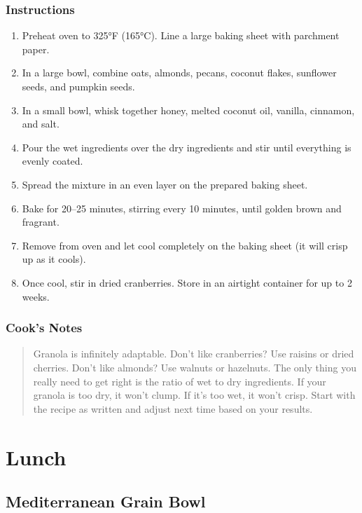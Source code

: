 \documentclass[
    language=english,
    doctype=recipe-book,
    institution=none,
]{../../omnilatex}
\begin{document}
\subsection*{Instructions}

\begin{enumerate}
    \item Preheat oven to 325°F (165°C). Line a large baking sheet with parchment paper.
    \item In a large bowl, combine oats, almonds, pecans, coconut flakes, sunflower seeds, and pumpkin seeds.
    \item In a small bowl, whisk together honey, melted coconut oil, vanilla, cinnamon, and salt.
    \item Pour the wet ingredients over the dry ingredients and stir until everything is evenly coated.
    \item Spread the mixture in an even layer on the prepared baking sheet.
    \item Bake for 20--25 minutes, stirring every 10 minutes, until golden brown and fragrant.
    \item Remove from oven and let cool completely on the baking sheet (it will crisp up as it cools).
    \item Once cool, stir in dried cranberries. Store in an airtight container for up to 2 weeks.
\end{enumerate}

\subsection*{Cook's Notes}
\begin{quote}
Granola is infinitely adaptable. Don't like cranberries? Use raisins or dried cherries. Don't like almonds? Use walnuts or hazelnuts. The only thing you really need to get right is the ratio of wet to dry ingredients. If your granola is too dry, it won't clump. If it's too wet, it won't crisp. Start with the recipe as written and adjust next time based on your results.
\end{quote}

\chapter{Lunch}

\section*{Mediterranean Grain Bowl}
\end{document}
